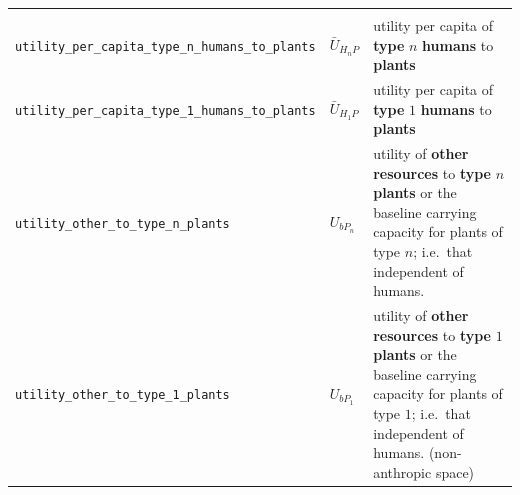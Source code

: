 \documentclass[
]{book}
\begin{document}
\begin{longtable}[]{@{}lll@{}}
\begin{minipage}[t]{0.40\columnwidth}
\end{minipage}\tabularnewline
\begin{minipage}[t]{0.27\columnwidth}\raggedright
\texttt{utility\_per\_capita\_type\_n\_humans\_to\_plants}\strut
\end{minipage} & \begin{minipage}[t]{0.25\columnwidth}\raggedright
\(\bar{U}_{H_{n}P}\)\strut
\end{minipage} & \begin{minipage}[t]{0.40\columnwidth}\raggedright
utility per capita of \textbf{type} \(n\) \textbf{humans} to \textbf{plants}\strut
\end{minipage}\tabularnewline
\begin{minipage}[t]{0.27\columnwidth}\raggedright
\texttt{utility\_per\_capita\_type\_1\_humans\_to\_plants}\strut
\end{minipage} & \begin{minipage}[t]{0.25\columnwidth}\raggedright
\(\bar{U}_{H_{1}P}\)\strut
\end{minipage} & \begin{minipage}[t]{0.40\columnwidth}\raggedright
utility per capita of \textbf{type} \(1\) \textbf{humans} to \textbf{plants}\strut
\end{minipage}\tabularnewline
\begin{minipage}[t]{0.27\columnwidth}\raggedright
\texttt{utility\_other\_to\_type\_n\_plants}\strut
\end{minipage} & \begin{minipage}[t]{0.25\columnwidth}\raggedright
\(U_{bP_{n}}\)\strut
\end{minipage} & \begin{minipage}[t]{0.40\columnwidth}\raggedright
utility of \textbf{other resources} to \textbf{type} \(n\) \textbf{plants} or the baseline carrying capacity for plants of type \(n\); i.e.~that independent of humans.\strut
\end{minipage}\tabularnewline
\begin{minipage}[t]{0.27\columnwidth}\raggedright
\texttt{utility\_other\_to\_type\_1\_plants}\strut
\end{minipage} & \begin{minipage}[t]{0.25\columnwidth}\raggedright
\(U_{bP_{1}}\)\strut
\end{minipage} & \begin{minipage}[t]{0.40\columnwidth}\raggedright
utility of \textbf{other resources} to \textbf{type} \(1\) \textbf{plants} or the baseline carrying capacity for plants of type \(1\); i.e.~that independent of humans. (non-anthropic space)\strut

\end{minipage}
\end{longtable}
\end{document}
